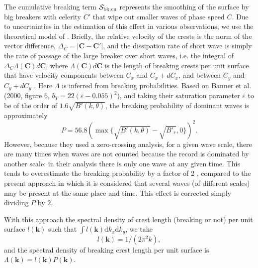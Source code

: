 The cumulative breaking term ${\cal S}_{\mathrm{bk,cu}}$ represents the smoothing
of the surface by big breakers with celerity $C'$ that wipe out smaller waves
of phase speed $C$. Due to uncertainties in the estimation of this effect in
various observations, we use the theoretical model of
\cite{art:Aea09}. Briefly, the relative velocity of the crests is the norm of
the vector difference, $\Delta_C =\left|\mathbf{C}-\mathbf{C}'\right|$, and
the dissipation rate of short wave is simply the rate of passage of the large
breaker over short waves, i.e. the integral of $\Delta_C \Lambda(\mathbf{C})
d\mathbf{C}$, where $\Lambda (\mathbf{C}) d\mathbf{C}$ is the length of
breaking crests per unit surface that have velocity components between $C_x$
and $C_x+dC_x$, and between $C_y$ and $C_y+dC_y$ \citep{art:Phi85}.  Here
$\Lambda$ is inferred from breaking probabilities. Based on Banner et
al. (2000, figure 6, $b_T=22
\left(\varepsilon-0.055\right)^2$)\nocite{art:BBY00}, and taking their
saturation parameter $\varepsilon$ to be of the order of $1.6
\sqrt{B'(k,\theta)}$, the breaking probability of dominant waves is
approximately
\begin{equation}
P=56.8\left(\max\{\sqrt{B'(k,\theta)}-\sqrt{B'_r},0\}\right)^2.\label{PBanner}
\end{equation}
However, because they used a zero-crossing analysis, for a given wave scale,
there are many times when waves are not counted because the record is
dominated by another scale: in their analysis there is only one wave at any
given time.  This tends to overestimate the breaking probability by a factor
of 2 \citep{art:FAB10}, compared to the present approach in which it is 
considered that several waves (of different scales) may be present at the same place and
time. This effect is corrected simply dividing $P$ by 2.


With this approach the spectral density of crest length (breaking or not) per
unit surface $l(\mathbf{k})$ such that $\int l(\mathbf{k}) \mathrm{d}k_x
\mathrm{d}k_y$, we take
\begin{equation}
l(\mathbf{k})= 1/(2\pi^2 k),
\end{equation}
and the spectral density of breaking crest length per unit surface is
$\Lambda(\mathbf{k})=l(\mathbf{k})P(\mathbf{k})$.  


